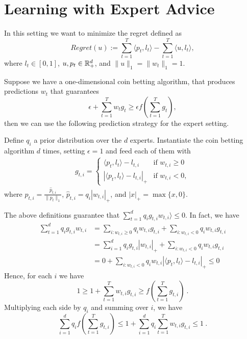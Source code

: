 \section{Learning with Expert Advice}

In this setting we want to minimize the regret defined as
\[
Regret(u):=\sum_{t=1}^T \langle p_t, l_t \rangle - \sum_{t=1}^T \langle u, l_t \rangle,
\]
where $l_t \in [0,1]$, $u, p_t \in \mathbb{R}^d_+$, and $\|u\|_1=\|w_t\|_1=1$.

Suppose we have a one-dimensional coin betting algorithm, that produces predictions $w_t$ that guarantees
\[
\epsilon + \sum_{t=1}^T w_t g_t \geq \epsilon f(\sum_{t=1}^T g_t),
\]
then we can use the following prediction strategy for the expert setting.

Define $q_i$ a prior distribution over the $d$ experts.
Instantiate the coin betting algorithm $d$ times, setting $\epsilon =1$ and feed each of them with
\begin{align}
g_{t,i} = \begin{cases}
\langle p_t, l_t\rangle - l_{t,i} & \text{if } w_{t,i} \geq 0 \\
|\langle p_t, l_t\rangle - l_{t,i}|_+ & \text{if } w_{t,i} < 0,
\end{cases}
\end{align}
where $p_{t,i} = \frac{\hat{p}_{t,i}}{\|p_{t}\|_1}$, $\hat{p}_{t,i}=q_i |w_{t,i}|_+$, and $|x|_+=\max\{x,0\}$.

The above definitions guarantee that $\sum_{t=1}^d q_i g_{t,i} w_{t,i}\rangle \leq 0$. In fact, we have
\begin{align*}
\sum_{t=1}^d q_i g_{t,i} w_{t,i}
&= \sum_{i:w_{t,i}\geq0} q_i w_{t,i} g_{t,i} + \sum_{i:w_{t,i}<0} q_i w_{t,i} g_{t,i} \\
&= \sum_{i=1}^d q_i g_{t,i} |w_{t,i}|_+ + \sum_{i:w_{t,i}<0} q_i w_{t,i} g_{t,i} \\
&= 0 + \sum_{i:w_{t,i}<0} q_i w_{t,i} |\langle p_t, l_t\rangle - l_{t,i}|_+ \leq 0
\end{align*}
Hence, for each $i$ we have
\[
1 \geq 1+\sum_{t=1}^T w_{t,i} g_{t,i} \geq f(\sum_{t=1}^T g_{t,i})~.
\]
Multiplying each side by $q_i$ and summing over $i$, we have
\begin{equation}
\label{eq:bounded_potential}
\sum_{i=1}^d q_i f(\sum_{t=1}^T g_{t,i}) \leq 1 + \sum_{i=1}^d q_i \sum_{t=1}^T w_{t,i} g_{t,i} \leq 1~.
\end{equation}

